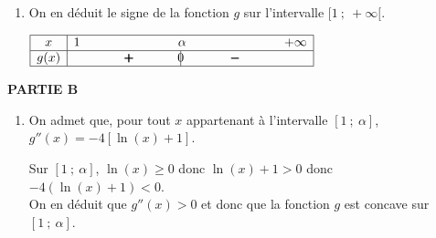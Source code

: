\documentclass[10pt]{article}
\begin{document}
\begin{enumerate}
\item On en déduit le signe de la fonction $g$ sur l'intervalle $[1~;~+\infty[$.

\begin{center}
\renewcommand{\arraystretch}{1.3}
\def\esp{\hspace*{2cm}}
$\begin{array}{|c | *{5}{c} |} 
\hline
x  & 1 & \esp & \alpha & \esp  & +\infty \\
\hline
g(x) &  & \pmb{+} &  \vline\hspace{-2.7pt}{0} & \pmb{-} &    \\
\hline
\end{array}$
\renewcommand{\arraystretch}{1}
\end{center}

\end{enumerate}

\medskip

\textbf{PARTIE B}

\medskip

\begin{enumerate}
\item On admet que, pour tout $x$ appartenant à l'intervalle $[1~;~\alpha]$, $g''(x) = - 4[\ln (x) + 1]$.



Sur $[1~;~\alpha]$, $\ln(x)\geqslant 0$ donc $\ln(x)+1>0$ donc $-4\left (\ln(x)+1\right )<0$. \\
On en déduit que $g''(x)>0$ et donc que la fonction $g$ est concave sur $[1~;~\alpha]$.
\end{enumerate}
\end{document}
